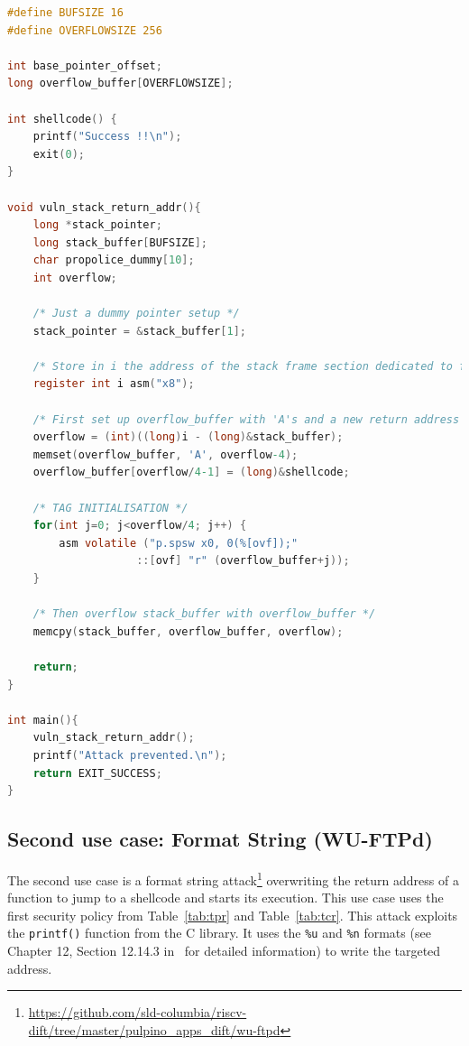 \begin{lstlisting}[style=topPosition, language=C, label=code:buffer_overflow, caption=Buffer overflow C code]
#define BUFSIZE 16
#define OVERFLOWSIZE 256

int base_pointer_offset;
long overflow_buffer[OVERFLOWSIZE];

int shellcode() {
    printf("Success !!\n");
    exit(0);
}

void vuln_stack_return_addr(){
    long *stack_pointer;
    long stack_buffer[BUFSIZE];
    char propolice_dummy[10];
    int overflow;
    
    /* Just a dummy pointer setup */
    stack_pointer = &stack_buffer[1];
    
    /* Store in i the address of the stack frame section dedicated to function arguments */
    register int i asm("x8");  
    
    /* First set up overflow_buffer with 'A's and a new return address */
    overflow = (int)((long)i - (long)&stack_buffer);
    memset(overflow_buffer, 'A', overflow-4);
    overflow_buffer[overflow/4-1] = (long)&shellcode;

    /* TAG INITIALISATION */
    for(int j=0; j<overflow/4; j++) {
        asm volatile ("p.spsw x0, 0(%[ovf]);"                
                    ::[ovf] "r" (overflow_buffer+j));
    }

    /* Then overflow stack_buffer with overflow_buffer */
    memcpy(stack_buffer, overflow_buffer, overflow); 
    
    return;
}

int main(){
    vuln_stack_return_addr();
    printf("Attack prevented.\n");
    return EXIT_SUCCESS;
}\end{lstlisting}

\subsection{Second use case: Format String (WU-FTPd)}
The second use case is a format string attack\footnote{\url{https://github.com/sld-columbia/riscv-dift/tree/master/pulpino_apps_dift/wu-ftpd}} overwriting the return address of a function to jump to a shellcode and starts its execution.  This use case uses the first security policy from Table~\ref{tab:tpr} and Table~\ref{tab:tcr}.
This attack exploits the \verb|printf()| function from the C library. It uses the \verb|%u| and \verb|%n| formats (see Chapter 12, Section 12.14.3 in~\cite{gnu_lib_c} for detailed information) to write the targeted address.

